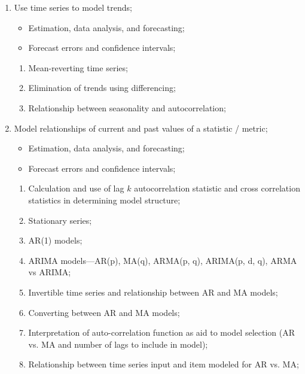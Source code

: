 \documentclass[12pt, titlepage, french]{report}
\begin{document}
\begin{outcomes}
\begin{enumerate}
	\item	Use time series to model trends;
		\begin{itemize}
		\item	Estimation, data analysis, and forecasting;
		\item	Forecast errors and confidence intervals;
		\end{itemize}
	\begin{knowledge}
	\begin{enumerate}
	\item	Mean-reverting time series;
	\item	Elimination of trends using differencing;
	\item	Relationship between seasonality and autocorrelation;
	\end{enumerate}
	\end{knowledge}
\tcbline
	\item	Model relationships of current and past values of a statistic / metric;
		\begin{itemize}
		\item	Estimation, data analysis, and forecasting;
		\item	Forecast errors and confidence intervals;
		\end{itemize}
	\begin{knowledge}
	\begin{enumerate}
	\item	Calculation and use of lag $k$ autocorrelation statistic and cross correlation statistics in determining model structure;
	\item	Stationary series;
	\item	AR(1) models;
	\item	ARIMA models---AR(p), MA(q), ARMA(p, q), ARIMA(p, d, q), ARMA vs ARIMA;
	\item	Invertible time series and relationship between AR and MA models;
	\item	Converting between AR and MA models;
	\item	Interpretation of auto-correlation function as aid to model selection (AR vs. MA and number of lags to include in model);
	\item	Relationship between time series input and item modeled for AR vs. MA;
	\end{enumerate}
	\end{knowledge}

\end{enumerate}
\end{outcomes}
\end{document}
